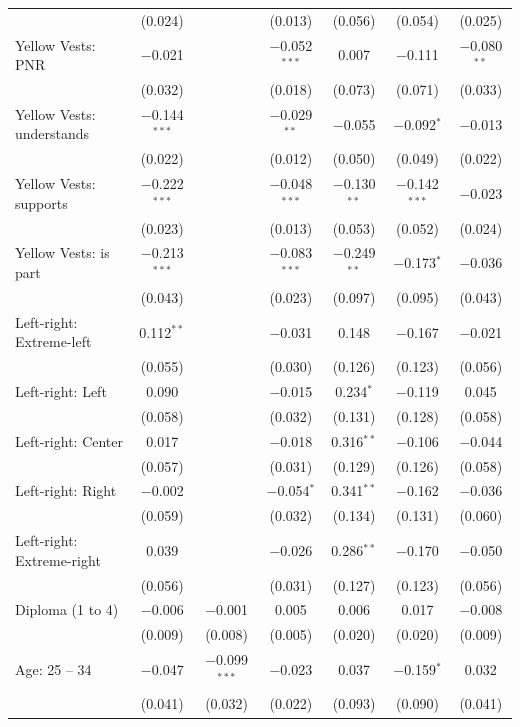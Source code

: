 \documentclass[english,5p,authoryear]{elsarticle}
\begin{document}
\begin{table}[!htbp]
{\begin{tabular}{@{\extracolsep{5pt}}lcccccc}
  & (0.024) &  & (0.013) & (0.056) & (0.054) & (0.025) \\ 
  Yellow Vests: PNR & $-$0.021 &  & $-$0.052$^{***}$ & 0.007 & $-$0.111 & $-$0.080$^{**}$ \\ 
  & (0.032) &  & (0.018) & (0.073) & (0.071) & (0.033) \\ 
  Yellow Vests: understands & $-$0.144$^{***}$ &  & $-$0.029$^{**}$ & $-$0.055 & $-$0.092$^{*}$ & $-$0.013 \\ 
  & (0.022) &  & (0.012) & (0.050) & (0.049) & (0.022) \\ 
  Yellow Vests: supports & $-$0.222$^{***}$ &  & $-$0.048$^{***}$ & $-$0.130$^{**}$ & $-$0.142$^{***}$ & $-$0.023 \\ 
  & (0.023) &  & (0.013) & (0.053) & (0.052) & (0.024) \\ 
  Yellow Vests: is part & $-$0.213$^{***}$ &  & $-$0.083$^{***}$ & $-$0.249$^{**}$ & $-$0.173$^{*}$ & $-$0.036 \\ 
  & (0.043) &  & (0.023) & (0.097) & (0.095) & (0.043) \\ 
  Left-right: Extreme-left & 0.112$^{**}$ &  & $-$0.031 & 0.148 & $-$0.167 & $-$0.021 \\ 
  & (0.055) &  & (0.030) & (0.126) & (0.123) & (0.056) \\ 
  Left-right: Left & 0.090 &  & $-$0.015 & 0.234$^{*}$ & $-$0.119 & 0.045 \\ 
  & (0.058) &  & (0.032) & (0.131) & (0.128) & (0.058) \\ 
  Left-right: Center & 0.017 &  & $-$0.018 & 0.316$^{**}$ & $-$0.106 & $-$0.044 \\ 
  & (0.057) &  & (0.031) & (0.129) & (0.126) & (0.058) \\ 
  Left-right: Right & $-$0.002 &  & $-$0.054$^{*}$ & 0.341$^{**}$ & $-$0.162 & $-$0.036 \\ 
  & (0.059) &  & (0.032) & (0.134) & (0.131) & (0.060) \\ 
  Left-right: Extreme-right & 0.039 &  & $-$0.026 & 0.286$^{**}$ & $-$0.170 & $-$0.050 \\ 
  & (0.056) &  & (0.031) & (0.127) & (0.123) & (0.056) \\ 
  Diploma (1 to 4) & $-$0.006 & $-$0.001 & 0.005 & 0.006 & 0.017 & $-$0.008 \\ 
  & (0.009) & (0.008) & (0.005) & (0.020) & (0.020) & (0.009) \\ 
  Age: 25 -- 34 & $-$0.047 & $-$0.099$^{***}$ & $-$0.023 & 0.037 & $-$0.159$^{*}$ & 0.032 \\ 
  & (0.041) & (0.032) & (0.022) & (0.093) & (0.090) & (0.041) \\ 

\end{tabular}}
\end{table}
\end{document}
